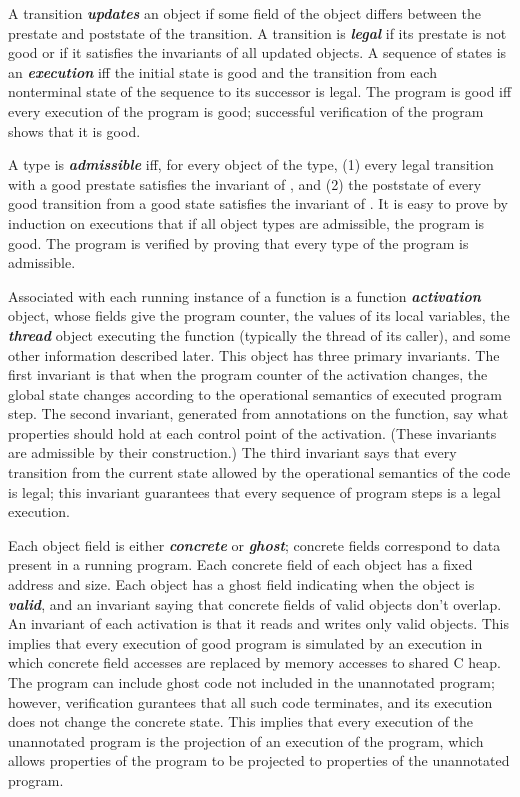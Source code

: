 \documentclass[preprint,nocopyrightspace]{sigplanconf}
\newcommand{\Def}[1]{\textit{\textbf{#1}}}
\begin{document}
A transition \Def{updates} an object if some field of the object differs
between the prestate and poststate of the transition. A transition
is \Def{legal} if its prestate is not good or if it satisfies the
invariants of all updated objects. A sequence of states is an
\Def{execution} iff the initial state
is good and the transition from each nonterminal state of the sequence
to its successor is legal. The program is good iff every execution of
the program is good; successful verification of the program shows that
it is good.

A type is \Def{admissible} iff, for every object  of the type,
(1) every legal transition with a good prestate satisfies the
invariant of , and (2) the poststate of every good transition
from a good state satisfies the invariant of . It is easy to
prove by induction on executions that if all object types are
admissible, the program is good. The program is verified by proving
that every type of the program is admissible.

Associated with each running instance of a function is a
function \Def{activation} object, whose fields give the program
counter, the values of its local variables, the \Def{thread} object
executing the function (typically the thread of its caller), and some
other information described later. This object has three primary
invariants. The first invariant is that when the program counter of
the activation changes, the global state changes according to the
operational semantics of executed program step. The second invariant,
generated from annotations on the function, say what properties should
hold at each control point of the activation.  (These invariants are
admissible by their construction.) The third invariant says that every
transition from the current state allowed by the operational semantics
of the code is legal; this invariant guarantees that every sequence of
program steps is a legal execution.

Each object field is either \Def{concrete} or \Def{ghost}; concrete
fields correspond to data present in a running program. 
Each concrete field of each object has a fixed address and 
size.  Each object has a ghost field indicating when the 
object is \Def{valid}, and an invariant saying that concrete fields
of valid objects don't overlap. An invariant
of each activation is that it reads and writes only valid
objects. This implies that every execution of good program is
simulated by an execution in which concrete field accesses are replaced
by memory accesses to shared C heap. 
The program can include ghost code not included in the unannotated
program; however, verification gurantees that all such code
terminates, and its execution does not change the concrete state. 
This implies that every execution of the unannotated program is 
the projection of an execution of the program, which allows properties
of the program to be projected to properties of the unannotated
program. 
\end{document}
